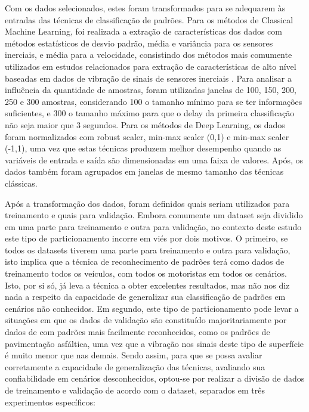 Com os dados selecionados, estes foram transformados para se adequarem às entradas das técnicas de classificação de padrões. Para os métodos de Classical Machine Learning, foi realizada a extração de características dos dados com métodos estatísticos de desvio padrão, média e variância para os sensores inerciais, e média para a velocidade, consistindo dos métodos mais comumente utilizados em estudos relacionados para extração de características de alto nível baseadas em dados de vibração de sinais de sensores inerciais \cite{Alqudah2016, Andria2016, BelloSalau2018, Bose2018, Hou2017, Li2016, Lima2016, Pholprasit2015, Prapulla2017, Savera2016, Singh2017}. Para analisar a influência da quantidade de amostras, foram utilizadas janelas de 100, 150, 200, 250 e 300 amostras, considerando 100 o tamanho mínimo para se ter informações suficientes, e 300 o tamanho máximo para que o delay da primeira classificação não seja maior que 3 segundos. Para os métodos de Deep Learning, os dados foram normalizados com robust scaler, min-max scaler (0,1) e min-max scaler (-1,1), uma vez que estas técnicas produzem melhor desempenho quando as variáveis de entrada e saída são dimensionadas em uma faixa de valores. Após, os dados também foram agrupados em janelas de mesmo tamanho das técnicas clássicas.

Após a transformação dos dados, foram definidos quais seriam utilizados para treinamento e quais para validação. Embora comumente um dataset seja dividido em uma parte para treinamento e outra para validação, no contexto deste estudo este tipo de particionamento incorre em viés por dois motivos. O primeiro, se todos os datasets tiverem uma parte para treinamento e outra para validação, isto implica que a técnica de reconhecimento de padrões terá como dados de treinamento todos os veículos, com todos os motoristas em todos os cenários. Isto, por si só, já leva a técnica a obter excelentes resultados, mas não nos diz nada a respeito da capacidade de generalizar sua classificação de padrões em cenários não conhecidos. Em segundo, este tipo de particionamento pode levar a situações em que os dados de validação são constituído majoritariamente por dados de com padrões mais facilmente reconhecidos, como os padrões de pavimentação asfáltica, uma vez que a vibração nos sinais deste tipo de superfície é muito menor que nas demais. Sendo assim, para que se possa avaliar corretamente a capacidade de generalização das técnicas, avaliando sua confiabilidade em cenários desconhecidos, optou-se por realizar a divisão de dados de treinamento e validação de acordo com o dataset, separados em três experimentos específicos:\newline

